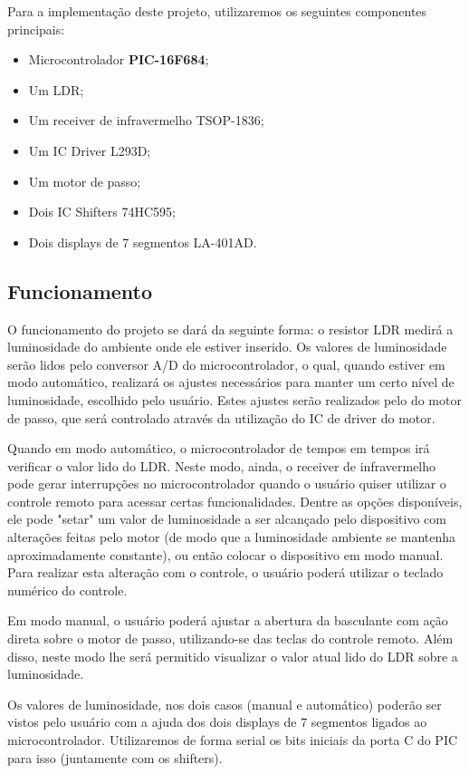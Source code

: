 ﻿\documentclass[12pt]{article}
\begin{document}
Para a implementação deste projeto, utilizaremos os seguintes componentes principais:

\begin{itemize}
\item Microcontrolador \textbf{PIC-16F684};
\item Um LDR;
\item Um receiver de infravermelho TSOP-1836;
\item Um IC Driver L293D;
\item Um motor de passo;
\item Dois IC Shifters 74HC595;
\item Dois displays de 7 segmentos LA-401AD.
\end{itemize}

\subsection{Funcionamento}
O funcionamento do projeto se dará da seguinte forma: o resistor LDR medirá a luminosidade do ambiente onde ele estiver inserido. Os valores de luminosidade serão lidos pelo conversor A/D do microcontrolador, o qual, quando estiver em modo automático, realizará os ajustes necessários para manter um certo nível de luminosidade, escolhido pelo usuário. Estes ajustes serão realizados pelo do motor de passo, que será controlado através da utilização do IC de driver do motor.

Quando em modo automático, o microcontrolador de tempos em tempos irá verificar o valor lido do LDR. Neste modo, ainda, o receiver de infravermelho pode gerar interrupções no microcontrolador quando o usuário quiser utilizar o controle remoto para acessar certas funcionalidades. Dentre as opções disponíveis, ele pode "setar" um valor de luminosidade a ser alcançado pelo dispositivo com alterações feitas pelo motor (de modo que a luminosidade ambiente se mantenha aproximadamente constante), ou então colocar o dispositivo em modo manual. Para realizar esta alteração com o controle, o usuário poderá utilizar o teclado numérico do controle.

Em modo manual, o usuário poderá ajustar a abertura da basculante com ação direta sobre o motor de passo, utilizando-se das teclas do controle remoto. Além disso, neste modo lhe será permitido visualizar o valor atual lido do LDR sobre a luminosidade.

Os valores de luminosidade, nos dois casos (manual e automático) poderão ser vistos pelo usuário com a ajuda dos dois displays de 7 segmentos ligados ao microcontrolador. Utilizaremos de forma serial os bits iniciais da porta C do PIC para isso (juntamente com os shifters).

\nocite{*}




\end{document}

